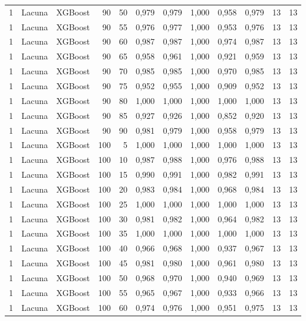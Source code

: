 \begin{longtable}{@{}rllrrrrrrrrr@{}}
1 & Lacuna & XGBoost & 90 & 50 & 0,979 & 0,979 & 1,000 & 0,958 & 0,979 & 13 & 13 \\
1 & Lacuna & XGBoost & 90 & 55 & 0,976 & 0,977 & 1,000 & 0,953 & 0,976 & 13 & 13 \\
1 & Lacuna & XGBoost & 90 & 60 & 0,987 & 0,987 & 1,000 & 0,974 & 0,987 & 13 & 13 \\
1 & Lacuna & XGBoost & 90 & 65 & 0,958 & 0,961 & 1,000 & 0,921 & 0,959 & 13 & 13 \\
1 & Lacuna & XGBoost & 90 & 70 & 0,985 & 0,985 & 1,000 & 0,970 & 0,985 & 13 & 13 \\
1 & Lacuna & XGBoost & 90 & 75 & 0,952 & 0,955 & 1,000 & 0,909 & 0,952 & 13 & 13 \\
1 & Lacuna & XGBoost & 90 & 80 & 1,000 & 1,000 & 1,000 & 1,000 & 1,000 & 13 & 13 \\
1 & Lacuna & XGBoost & 90 & 85 & 0,927 & 0,926 & 1,000 & 0,852 & 0,920 & 13 & 13 \\
1 & Lacuna & XGBoost & 90 & 90 & 0,981 & 0,979 & 1,000 & 0,958 & 0,979 & 13 & 13 \\
1 & Lacuna & XGBoost & 100 & 5 & 1,000 & 1,000 & 1,000 & 1,000 & 1,000 & 13 & 13 \\
1 & Lacuna & XGBoost & 100 & 10 & 0,987 & 0,988 & 1,000 & 0,976 & 0,988 & 13 & 13 \\
1 & Lacuna & XGBoost & 100 & 15 & 0,990 & 0,991 & 1,000 & 0,982 & 0,991 & 13 & 13 \\
1 & Lacuna & XGBoost & 100 & 20 & 0,983 & 0,984 & 1,000 & 0,968 & 0,984 & 13 & 13 \\
1 & Lacuna & XGBoost & 100 & 25 & 1,000 & 1,000 & 1,000 & 1,000 & 1,000 & 13 & 13 \\
1 & Lacuna & XGBoost & 100 & 30 & 0,981 & 0,982 & 1,000 & 0,964 & 0,982 & 13 & 13 \\
1 & Lacuna & XGBoost & 100 & 35 & 1,000 & 1,000 & 1,000 & 1,000 & 1,000 & 13 & 13 \\
1 & Lacuna & XGBoost & 100 & 40 & 0,966 & 0,968 & 1,000 & 0,937 & 0,967 & 13 & 13 \\
1 & Lacuna & XGBoost & 100 & 45 & 0,981 & 0,980 & 1,000 & 0,961 & 0,980 & 13 & 13 \\
1 & Lacuna & XGBoost & 100 & 50 & 0,968 & 0,970 & 1,000 & 0,940 & 0,969 & 13 & 13 \\
1 & Lacuna & XGBoost & 100 & 55 & 0,965 & 0,967 & 1,000 & 0,933 & 0,966 & 13 & 13 \\
1 & Lacuna & XGBoost & 100 & 60 & 0,974 & 0,976 & 1,000 & 0,951 & 0,975 & 13 & 13 \\

\end{longtable}
